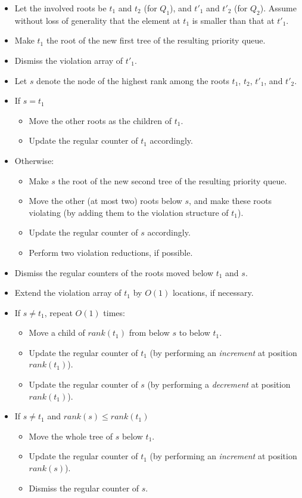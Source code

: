 \documentclass{llncs}
\begin{document}
\begin{itemize}
\item Let the involved roots be $t_1$ and $t_2$ (for $Q_1$), and $t'_1$
  and $t'_2$ (for $Q_2$). Assume without loss of generality that
  the element at $t_1$ is smaller than that at $t'_1$.
\item Make $t_1$ the root of the new first tree of the resulting priority queue.
\item Dismiss the violation array of $t'_1$.
\item Let $s$ denote the node of the highest rank among the roots
  $t_1$, $t_2$, $t'_1$, and $t'_2$.
\item If $s = t_1$
 \begin{itemize}
  \item Move the other roots as the children of $t_1$. 
  \item Update the regular counter of $t_1$ accordingly.
 \end{itemize}
\item Otherwise:
 \begin{itemize}
  \item Make $s$ the root of the new second tree of the resulting priority queue.
  \item Move the other (at most two) roots below $s$, and make these roots violating 
  (by adding them to the violation structure of $t_1$).
  \item Update the regular counter of $s$ accordingly.
  \item Perform two violation reductions, if possible.
 \end{itemize}
\item Dismiss the regular counters of the roots moved below $t_1$ and $s$.
\item Extend the violation array of $t_1$ by $O(1)$ locations, if necessary.
\item If $s \neq t_1$, repeat $O(1)$ times: 
   \begin{itemize}
    \item Move a child of $\mathit{rank}(t_1)$ from below $s$ to below $t_1$.
    \item  Update the regular counter of $t_1$ (by performing an {\it increment} at position $\mathit{rank}(t_1)$).
    \item  Update the regular counter of $s$ (by performing a {\it decrement} at position $\mathit{rank}(t_1)$).
   \end{itemize}
\item If $s \neq t_1$ and $\mathit{rank}(s) \leq \mathit{rank}(t_1)$
	\begin{itemize} 
		\item  Move the whole tree of $s$ below $t_1$.
	  \item  Update the regular counter of $t_1$ (by performing an {\it increment} at position $rank(s)$).
	  \item  Dismiss the regular counter of $s$.
  \end{itemize}
\end{itemize}
\end{document}
